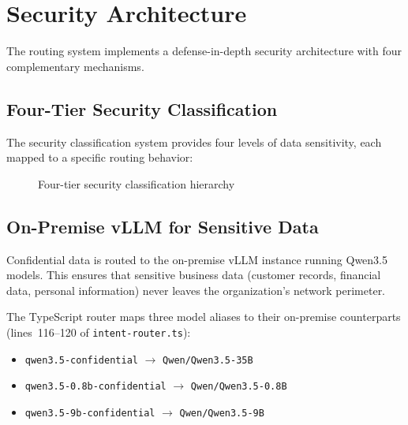 \documentclass[11pt]{article}
\begin{document}
\section{Security Architecture}
\label{sec:security}

The routing system implements a defense-in-depth security architecture with
four complementary mechanisms.

\subsection{Four-Tier Security Classification}

The security classification system provides four levels of data sensitivity,
each mapped to a specific routing behavior:

\begin{figure}[h]
\centering
{}
\caption{Four-tier security classification hierarchy}
\label{fig:security-tiers}
\end{figure}

\subsection{On-Premise vLLM for Sensitive Data}

Confidential data is routed to the on-premise vLLM instance running Qwen3.5
models. This ensures that sensitive business data (customer records, financial
data, personal information) never leaves the organization's network perimeter.

The TypeScript router maps three model aliases to their on-premise counterparts
(lines~116--120 of \texttt{intent-router.ts}):

\begin{itemize}
  \item \texttt{qwen3.5-confidential} $\rightarrow$ \texttt{Qwen/Qwen3.5-35B}
  \item \texttt{qwen3.5-0.8b-confidential} $\rightarrow$ \texttt{Qwen/Qwen3.5-0.8B}
  \item \texttt{qwen3.5-9b-confidential} $\rightarrow$ \texttt{Qwen/Qwen3.5-9B}
\end{itemize}
\end{document}
